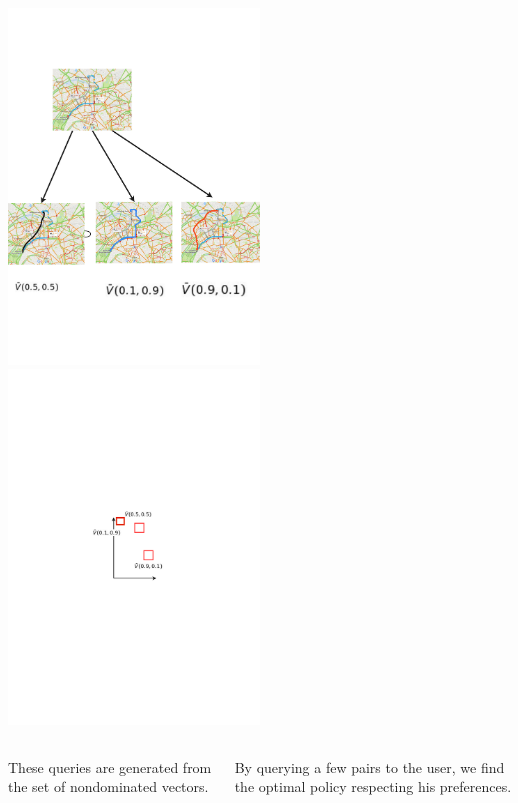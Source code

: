 \documentclass{beamer}
\begin{document}
\begin{frame}
\includegraphics[width=0.5\textwidth]{figures-new/pro} 
\includegraphics[width=0.5\textwidth]{figures-new/search} ~\\
\begin{columns}
\begin{column}{0.48\textwidth}
These queries are generated from the set of nondominated vectors.
\end{column}
\hfill
\begin{column}{0.48\textwidth}
By querying a few pairs to the user, we find the optimal policy respecting his preferences. 
\end{column}
\end{columns}
\end{frame}
\end{document}
